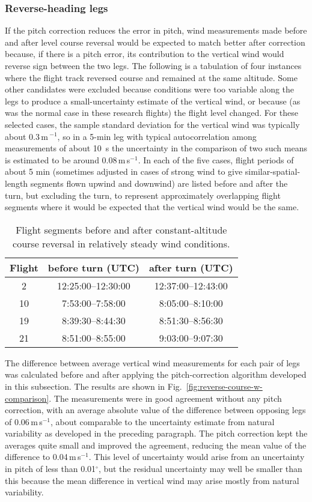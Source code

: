\documentclass[english,british,amtd,bookmarks=false,unicode=true]{copernicus}\usepackage[]{graphicx}\usepackage[]{color}
\providecommand{\tabularnewline}{\\}
\begin{document}
\subsubsection{Reverse-heading legs}

If the pitch correction reduces the error in pitch, wind measurements
made before and after level course reversal would be expected to match
better after correction because, if there is a pitch error, its contribution
to the vertical wind would reverse sign between the two legs. The
following is a tabulation of four instances where the flight track
reversed course and remained at the same altitude. Some other candidates
were excluded because conditions were too variable along the legs
to produce a small-uncertainty estimate of the vertical wind, or because
(as was the normal case in these research flights) the flight level
changed. For these selected cases, the sample standard deviation for
the vertical wind was typically about 0.3\,m\,$^{-1}$, so in a
5-min leg with typical autocorrelation among measurements of about
10~s the uncertainty in the comparison of two such means is estimated
to be around 0.08\,m\,s$^{-1}$. In each of the five cases, flight
periods of about 5 min (sometimes adjusted in cases of strong wind
to give similar-spatial-length segments flown upwind and downwind)
are listed before and after the turn, but excluding the turn, to represent
approximately overlapping flight segments where it would be expected
that the vertical wind would be the same. 

\begin{table}
\caption{Flight segments before and after constant-altitude course reversal
in relatively steady wind conditions.}


\centering{}%
\begin{tabular}{|c|c|c|}
\hline 
\textbf{Flight} &
\textbf{before turn (UTC)} &
\textbf{after turn (UTC)}\tabularnewline
\hline 
\hline 
2 &
12:25:00--12:30:00 &
12:37:00--12:43:00\tabularnewline
\hline 
10 &
7:53:00--7:58:00 &
8:05:00--8:10:00\tabularnewline
\hline 
19 &
8:39:30--8:44:30 &
8:51:30--8:56:30\tabularnewline
\hline 
21 &
8:51:00--8:55:00 &
9:03:00--9:07:30\tabularnewline
\hline 
\end{tabular}
\end{table}




The difference between average vertical wind measurements for each
pair of legs was calculated before and after applying the pitch-correction
algorithm developed in this subsection. The results are shown in Fig.~\ref{fig:reverse-course-w-comparison}.
The measurements were in good agreement without any pitch correction,
with an average absolute value of the difference between opposing
legs of 0.06\,m\,s$^{-1}$,
about comparable to the uncertainty estimate from natural variability
as developed in the preceding paragraph. The pitch correction kept
the averages quite small and improved the agreement, reducing the
mean value of the difference to 0.04\,m\,s$^{-1}$.
This level of uncertainty would arise from an uncertainty in pitch
of less than 0.01$^{\circ}$, but the residual uncertainty may well
be smaller than this because the mean difference in vertical wind
may arise mostly from natural variability. 
\end{document}
